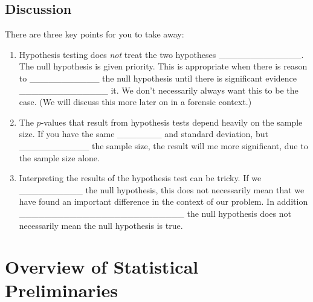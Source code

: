\documentclass[]{book}
\providecommand{\tightlist}{%
  \setlength{\itemsep}{0pt}\setlength{\parskip}{0pt}}
\theoremstyle{definition}
\theoremstyle{definition}
\theoremstyle{remark}
\begin{document}
\subsection{Discussion}\label{discussion}

There are three key points for you to take away:

\begin{enumerate}
\def\labelenumi{\arabic{enumi}.}
\tightlist
\item
  Hypothesis testing does \emph{not} treat the two hypotheses
  \_\_\_\_\_\_\_\_\_\_\_\_\_. The null hypothesis is given priority.
  This is appropriate when there is reason to \_\_\_\_\_\_\_\_\_\_\_ the
  null hypothesis until there is significant evidence
  \_\_\_\_\_\_\_\_\_\_\_\_\_\_ it. We don't necessarily always want this
  to be the case. (We will discuss this more later on in a forensic
  context.) \vspace{.1in}
\item
  The \(p\)-values that result from hypothesis tests depend heavily on
  the sample size. If you have the same \_\_\_\_\_\_\_ and standard
  deviation, but \_\_\_\_\_\_\_\_\_\_\_ the sample size, the result will
  me more significant, due to the sample size alone. \vspace{.1in}
\item
  Interpreting the results of the hypothesis test can be tricky. If we
  \_\_\_\_\_\_\_\_\_\_ the null hypothesis, this does not necessarily
  mean that we have found an important difference in the context of our
  problem. In addition
  \_\_\_\_\_\_\_\_\_\_\_\_\_\_\_\_\_\_\_\_\_\_\_\_\_\_ the null
  hypothesis does not necessarily mean the null hypothesis is true.
\end{enumerate}

\section{Overview of Statistical
Preliminaries}\label{overview-of-statistical-preliminaries}
\end{document}
